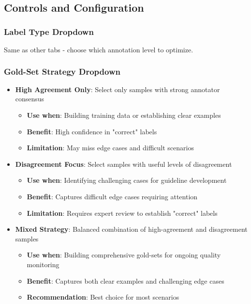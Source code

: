 \documentclass[11pt]{article}
\begin{document}
\subsection{Controls and Configuration}

\subsubsection{Label Type Dropdown}
Same as other tabs - choose which annotation level to optimize.

\subsubsection{Gold-Set Strategy Dropdown}
\begin{itemize}
\item \textbf{High Agreement Only}: Select only samples with strong annotator consensus
\begin{itemize}
\item \textbf{Use when}: Building training data or establishing clear examples
\item \textbf{Benefit}: High confidence in "correct" labels
\item \textbf{Limitation}: May miss edge cases and difficult scenarios
\end{itemize}
\item \textbf{Disagreement Focus}: Select samples with useful levels of disagreement
\begin{itemize}
\item \textbf{Use when}: Identifying challenging cases for guideline development
\item \textbf{Benefit}: Captures difficult edge cases requiring attention
\item \textbf{Limitation}: Requires expert review to establish "correct" labels
\end{itemize}
\item \textbf{Mixed Strategy}: Balanced combination of high-agreement and disagreement samples
\begin{itemize}
\item \textbf{Use when}: Building comprehensive gold-sets for ongoing quality monitoring
\item \textbf{Benefit}: Captures both clear examples and challenging edge cases
\item \textbf{Recommendation}: Best choice for most scenarios
\end{itemize}
\end{itemize}
\end{document}
